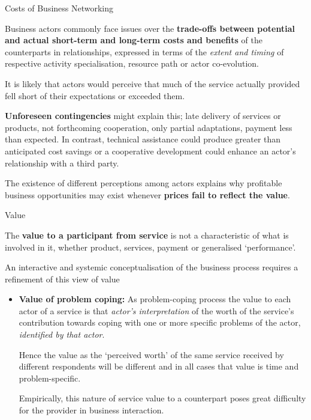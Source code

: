 \documentclass{beamer}
\begin{document}
\begin{frame}{Costs of Business Networking}\small

Business actors commonly face issues over the \textbf{trade-offs between
  potential and actual short-term and long-term costs and beneﬁts} of the
counterparts in relationships, expressed in terms of the \emph{extent and
  timing} of respective activity specialisation, resource path or actor
co-evolution.

It is likely that actors would perceive that much of the service actually
provided fell short of their expectations or exceeded them.

\textbf{Unforeseen contingencies} might explain this; late delivery of
services or products, not forthcoming cooperation, only partial adaptations,
payment less than expected. In contrast, technical assistance could produce
greater than anticipated cost savings or a cooperative development could
enhance an actor's relationship with a third party.

The existence of different perceptions among actors explains why proﬁtable
business opportunities may exist whenever \textbf{prices fail to reﬂect the
  value}.
\end{frame}

\begin{frame}{Value}\small

The \textbf{value to a participant from service} is not a characteristic of
what is involved in it, whether product, services, payment or generalised
‘performance’.

An interactive and systemic conceptualisation of the business process requires
a refinement of this view of value
\begin{itemize}
\item \textbf{Value of problem coping:} As problem-coping process the value to
  each actor of a service is that \emph{actor's interpretation} of the worth
  of the service's contribution towards coping with one or more speciﬁc
  problems of the actor, \emph{identiﬁed by that actor}.

  Hence the value as the ‘perceived worth’ of the same service received by
  different respondents will be different and in all cases that value is time
  and problem-speciﬁc.

  Empirically, this nature of service value to a counterpart poses great
  difficulty for the provider in business interaction.
\end{itemize}
\end{frame}
\end{document}
